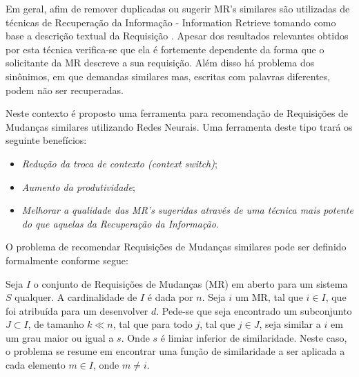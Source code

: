 \documentclass[msc,proposal,hidelot,hideabstract]{ppgccufmg} %
\begin{document}
Em geral, afim de remover duplicadas ou sugerir MR's similares são utilizadas de
técnicas de Recuperação da Informação - Information Retrieve
\cite{baeza1999modern} tomando como base a descrição textual da Requisição \cite{101186,Runeson:2007:DDD:1248820.1248882}. Apesar dos resultados
relevantes obtidos por esta técnica verifica-se que ela é fortemente
dependente da forma que o solicitante da MR descreve a sua requisição. Além disso
há problema dos sinônimos, em que demandas similares mas, escritas com palavras
diferentes, podem não ser recuperadas.

Neste contexto é proposto uma ferramenta para recomendação de Requisições de
Mudanças similares utilizando Redes Neurais. Uma ferramenta deste tipo trará os
seguinte benefícios:

\begin{itemize}
\item \textit{Redução da troca de contexto (context switch)};
\item \textit{Aumento da produtividade};
\item \textit{Melhorar a qualidade das MR's sugeridas através de uma técnica mais
  potente do que aquelas da Recuperação da Informação}.
\end{itemize}

O problema de recomendar Requisições de Mudanças similares pode ser definido
formalmente conforme segue:

Seja $I$ o conjunto de Requisições de Mudanças (MR) em aberto para um
sistema $S$ qualquer. A cardinalidade de $I$ é dada por $n$. Seja $i$ um MR,
tal que $i \in I$, que foi atribuída para um desenvolver
$d$. Pede-se que seja encontrado um subconjunto $J \subset I$, de tamanho $k \ll n$, tal
que para todo $j$, tal que $j \in J$, seja similar a $i$ em um grau maior ou igual a
$s$. Onde $s$ é limiar inferior de similaridade. Neste caso, o problema se resume em
encontrar uma função de similaridade a ser aplicada a cada elemento $m \in I$,
onde $m \neq i$.
\end{document}
